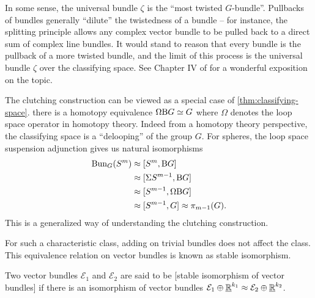 In some sense, the universal bundle $\zeta$ is the ``most twisted $G$-bundle''. Pullbacks of bundles generally ``dilute'' the twistedness of a bundle -- for instance, the splitting principle allows any complex vector bundle to be pulled back to a direct sum of complex line bundles. It would stand to reason that every bundle is the pullback of a more twisted bundle, and the limit of this process is the universal bundle $\zeta$ over the classifying space. See Chapter IV of \cite{botttu1982differential} for a wonderful exposition on the topic.


\begin{remark}\label{rmk:clutching-construction-generalization}
	The clutching construction can be viewed as a special case of \cref{thm:classifying-space}.
	 there is a homotopy equivalence $\Omega \mathrm{B} G \simeq G$ where $\Omega$ denotes the loop space operator in homotopy theory. Indeed from a homotopy theory perspective, the classifying space is a ``delooping'' of the group $G$. For spheres, the loop space suspension adjunction gives us natural isomorphisms
	\[
		\begin{aligned}
			\operatorname{Bun}_{G}(S^m) & \approx [S^m, \mathrm{B} G]            \\
			              & \approx [\Sigma S^{m-1}, \mathrm{B} G] \\
			              & \approx [S^{m-1}, \Omega\mathrm{B} G]  \\
			              & \approx [S^{m-1}, G]
			\approx \pi_{m-1}(G).
		\end{aligned}
	\]
	This is a generalized way of understanding the clutching construction.
\end{remark}


For such a characteristic class, adding on trivial bundles does not affect the class. This equivalence relation on vector bundles is known as stable isomorphism.

\begin{definition}\label{def:stable-isomorphism}
	Two vector bundles $\mathcal{E}_1$ and $\mathcal{E}_2$ are said to be [stable isomorphism of vector bundles] if there is an isomorphism of vector bundles $\mathcal{E}_1\oplus \underline{\mathbb{R}}^{k_1} \approx \mathcal{E}_2\oplus \underline{\mathbb{R}}^{k_2}$.
\end{definition}
